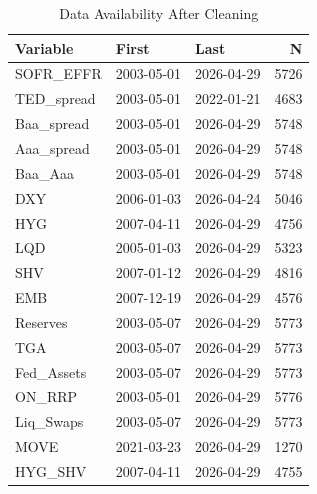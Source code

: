 \begin{table}[htbp]
\centering
\caption{Data Availability After Cleaning} 
\label{tab:data_availability}
\begin{tabular}{lllr}
  \toprule
Variable & First & Last & N \\ 
  \midrule
SOFR\_EFFR & 2003-05-01 & 2026-04-29 & 5726 \\ 
  TED\_spread & 2003-05-01 & 2022-01-21 & 4683 \\ 
  Baa\_spread & 2003-05-01 & 2026-04-29 & 5748 \\ 
  Aaa\_spread & 2003-05-01 & 2026-04-29 & 5748 \\ 
  Baa\_Aaa & 2003-05-01 & 2026-04-29 & 5748 \\ 
  DXY & 2006-01-03 & 2026-04-24 & 5046 \\ 
  HYG & 2007-04-11 & 2026-04-29 & 4756 \\ 
  LQD & 2005-01-03 & 2026-04-29 & 5323 \\ 
  SHV & 2007-01-12 & 2026-04-29 & 4816 \\ 
  EMB & 2007-12-19 & 2026-04-29 & 4576 \\ 
  Reserves & 2003-05-07 & 2026-04-29 & 5773 \\ 
  TGA & 2003-05-07 & 2026-04-29 & 5773 \\ 
  Fed\_Assets & 2003-05-07 & 2026-04-29 & 5773 \\ 
  ON\_RRP & 2003-05-01 & 2026-04-29 & 5776 \\ 
  Liq\_Swaps & 2003-05-07 & 2026-04-29 & 5773 \\ 
  MOVE & 2021-03-23 & 2026-04-29 & 1270 \\ 
  HYG\_SHV & 2007-04-11 & 2026-04-29 & 4755 \\ 
   \bottomrule
\end{tabular}
\end{table}
